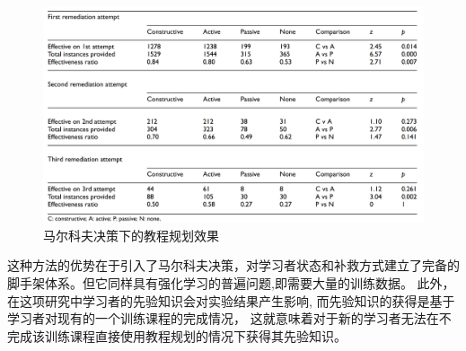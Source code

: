 \documentclass{article}
\begin{document}
            \begin{figure}[H]
            	
            	\centering
            	\includegraphics[scale=0.25]{images/Markov_result.png}
            	\caption{马尔科夫决策下的教程规划效果}
            	\label{fig:label}
            \end{figure}

            这种方法的优势在于引入了马尔科夫决策，对学习者状态和补救方式建立了完备的脚手架体系。但它同样具有强化学习的普遍问题,即需要大量的训练数据。
            此外，在这项研究中学习者的先验知识会对实验结果产生影响,
            而先验知识的获得是基于学习者对现有的一个训练课程的完成情况，
            这就意味着对于新的学习者无法在不完成该训练课程直接使用教程规划的情况下获得其先验知识。
\end{document}
